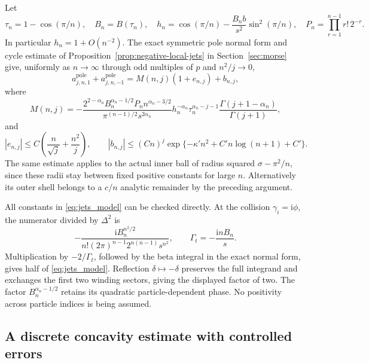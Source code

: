 \documentclass[11pt]{article}
\numberwithin{equation}{section}
\theoremstyle{definition}
\newcommand{\ii}{\mathrm i}
\begin{document}
Let
\begin{equation}\label{eq:jets_model_parameters}
 \tau_n=1-\cos(\pi/n),\quad B_n=B(\tau_n),\quad
 h_n=\cos(\pi/n)-\frac{B_n b}{s^2}\sin^2(\pi/n),\quad
 P_n=\prod_{r=1}^{n-1}r!\,2^{-r}.
\end{equation}
In particular $h_n=1+O(n^{-2})$. The exact symmetric pole normal
form and cycle estimate of Proposition~\ref{prop:negative-local-jets}
in Section~\ref{sec:morse} give, uniformly
as $n\to\infty$ through odd multiples of $p$ and $n^2/j\to0$,
\begin{equation}\label{eq:jets_uniform_model}
 a_{j,n,1}^{\mathrm{pole}}+a_{j,n,-1}^{\mathrm{pole}}
 =M(n,j)(1+e_{n,j})+b_{n,j},
\end{equation}
where
\begin{equation}\label{eq:jets_model}
 M(n,j)=-\frac{2^{2-\alpha_n}B_n^{\alpha_n-1/2}P_n
                     n^{\alpha_n-3/2}}
                   {\pi^{(n-1)/2}s^{2\alpha_n}}
 h_n^{-\alpha_n}\tau_n^{\alpha_n-j-1}
 \frac{\Gamma(j+1-\alpha_n)}{\Gamma(j+1)},
\end{equation}
and
\begin{equation}\label{eq:jets_model_errors}
 |e_{n,j}|\le C\left(\frac n{\sqrt j}+\frac{n^2}j\right),\qquad
 |b_{n,j}|\le(Cn)^j
       \exp\{-\kappa' n^2+C'n\log(n+1)+C'\}.
\end{equation}
The same estimate applies to the actual inner ball of radius squared
$\sigma-\pi^2/n$, since these radii stay between fixed positive
constants for large $n$. Alternatively its outer shell belongs to a
$c/n$ analytic remainder by the preceding argument.

All constants in \eqref{eq:jets_model} can be checked directly.
At the collision $\gamma_i=\ii\phi$, the numerator divided by
$\Delta^2$ is
\[
 -\frac{\ii B_n^{n^2/2}}
       {n!(2\pi)^{n-1}2^{n(n-1)}s^{n^2}},
 \qquad \Gamma_t=-\frac{\ii nB_n}s.
\]
Multiplication by $-2/\Gamma_t$, followed by the beta integral in
the exact normal form, gives half of \eqref{eq:jets_model}.
Reflection $\delta\mapsto-\delta$ preserves the full integrand and
exchanges the first two winding sectors, giving the displayed
factor of two. The factor $B_n^{\alpha_n-1/2}$ retains its quadratic
particle-dependent phase. No positivity across particle indices is
being assumed.

\subsection{A discrete concavity estimate with controlled errors}
\end{document}

